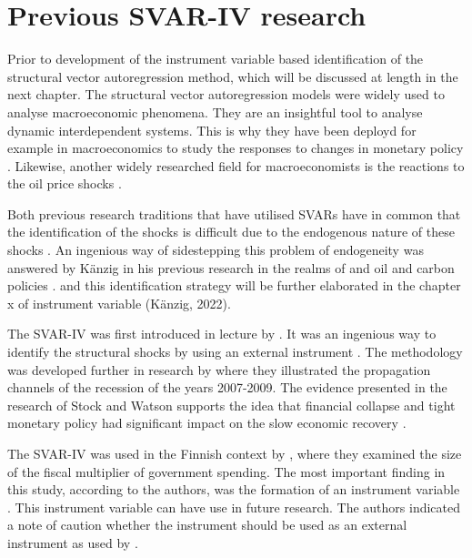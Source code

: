 \documentclass[
  12pt,
  a4paper,
]{report}
\begin{document}
\hypertarget{prevsvar}{%
\section{Previous SVAR-IV research}\label{prevsvar}}

Prior to development of the instrument variable based identification of the structural vector autoregression method, which will be discussed at length in the next chapter. The structural vector autoregression models were widely used to analyse macroeconomic phenomena. They are an insightful tool to analyse dynamic interdependent systems. This is why they have been deployd for example in macroeconomics to study the responses to changes in monetary policy \citep{wolf2020svar}. Likewise, another widely researched field for macroeconomists is the reactions to the oil price shocks \citep{kilian2009not}.

Both previous research traditions that have utilised SVARs have in common that the identification of the shocks is difficult due to the endogenous nature of these shocks \citep{kaenzig2021}. An ingenious way of sidestepping this problem of endogeneity was answered by Känzig in his previous research in the realms of and oil and carbon policies \citep{kaenzig2022,kaenzig2021}. and this identification strategy will be further elaborated in the chapter x of instrument variable (Känzig, 2022).

The SVAR-IV was first introduced in lecture by \citet{stock2008s}. It was an ingenious way to identify the structural shocks by using an external instrument \citep{stock2008s}. The methodology was developed further in research by \citet{stock2012disentangling} where they illustrated the propagation channels of the recession of the years 2007-2009. The evidence presented in the research of Stock and Watson supports the idea that financial collapse and tight monetary policy had significant impact on the slow economic recovery \citep{stock2012disentangling}.

The SVAR-IV was used in the Finnish context by \citet{keranen2020identification}, where they examined the size of the fiscal multiplier of government spending. The most important finding in this study, according to the authors, was the formation of an instrument variable \citep{keranen2020identification}. This instrument variable can have use in future research. The authors indicated a note of caution whether the instrument should be used as an external instrument as used by \citet{stock2008s,stock2012disentangling} \citep{keranen2020identification}.
\end{document}
